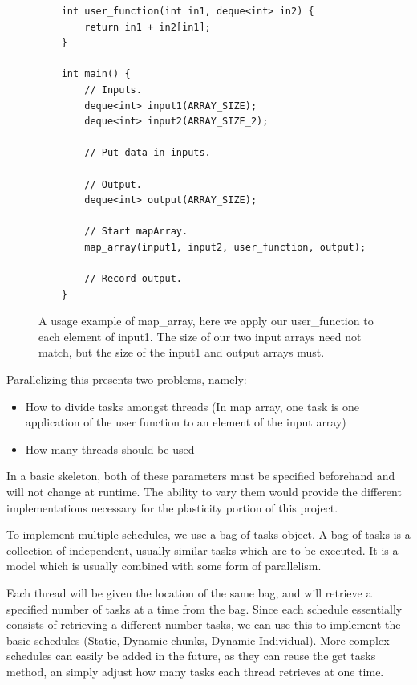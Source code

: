 \begin{figure}
	\begin{lstlisting}
	int user_function(int in1, deque<int> in2) {
		return in1 + in2[in1];
	}

	int main() {
		// Inputs.
		deque<int> input1(ARRAY_SIZE);
		deque<int> input2(ARRAY_SIZE_2);

		// Put data in inputs.

		// Output.
		deque<int> output(ARRAY_SIZE);

		// Start mapArray.
		map_array(input1, input2, user_function, output);

		// Record output.
	}
	\end{lstlisting}

	\caption{A usage example of map\_array, here we apply our user\_function to each element of input1. The size of our two input arrays need not match, but the size of the input1 and output arrays must.}
	\label{fig:implementation_map_array_usage_example}
\end{figure}



\begin{minipage}{\textwidth}

Parallelizing this presents two problems, namely:

\begin{itemize}
	\item How to divide tasks amongst threads (In map array, one task is one application of the user function to an element of the input array)
	\item How many threads should be used
\end{itemize}

\end{minipage}
 
In a basic skeleton, both of these parameters must be specified beforehand and will not change at runtime. The ability to vary them would provide the different implementations necessary for the plasticity portion of this project.

To implement multiple schedules, we use a bag of tasks object. A bag of tasks is a collection of independent, usually similar tasks which are to be executed. It is a model which is usually combined with some form of parallelism.

Each thread will be given the location of the same bag, and will retrieve a specified number of tasks at a time from the bag. Since each schedule essentially consists of retrieving a different number tasks, we can use this to implement the basic schedules (Static, Dynamic chunks, Dynamic Individual). More complex schedules can easily be added in the future, as they can reuse the get tasks method, an simply adjust how many tasks each thread retrieves at one time.

